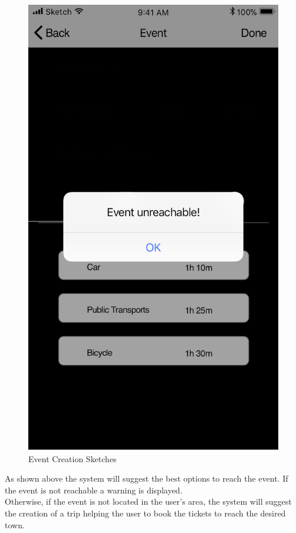 \begin{enumerate}
\begin{figure}[H]
				\includegraphics[scale=0.25]{Images/Sketch/Event_Creation_3}
				\caption{Event Creation Sketches}
			\end{figure}
			As shown above the system will suggest the best options to reach the event. If the event is not reachable a warning is displayed.\\
			Otherwise, if the event is not located in the user’s area, the system will suggest the creation of a trip helping the user to book the tickets to reach the desired town.

\end{enumerate}
